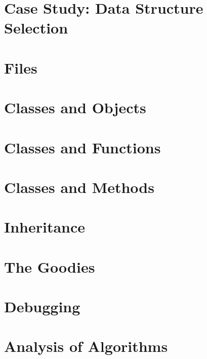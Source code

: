 \documentclass[a4paper,11pt]{book}
\begin{document}
\chapter{Case Study: Data Structure Selection}
\chapter{Files}
\chapter{Classes and Objects}
\chapter{Classes and Functions}
\chapter{Classes and Methods}
\chapter{Inheritance}
\chapter{The Goodies}
\chapter{Debugging}
\chapter{Analysis of Algorithms}
\end{document}
